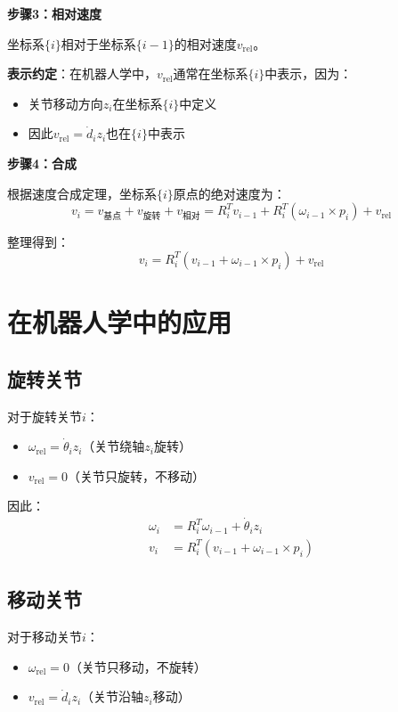 \documentclass[12pt,a4paper]{article}
\begin{document}
\textbf{步骤3：相对速度}

坐标系$\{i\}$相对于坐标系$\{i-1\}$的相对速度$v_{\text{rel}}$。

\textbf{表示约定}：在机器人学中，$v_{\text{rel}}$通常在坐标系$\{i\}$中表示，因为：
\begin{itemize}
\item 关节移动方向$z_i$在坐标系$\{i\}$中定义
\item 因此$v_{\text{rel}} = \dot{d}_i z_i$也在$\{i\}$中表示
\end{itemize}

\textbf{步骤4：合成}

根据速度合成定理，坐标系$\{i\}$原点的绝对速度为：
\begin{equation}
v_i = v_{\text{基点}} + v_{\text{旋转}} + v_{\text{相对}} = R_i^T v_{i-1} + R_i^T (\omega_{i-1} \times p_i) + v_{\text{rel}}
\end{equation}

整理得到：
\begin{equation}
v_i = R_i^T (v_{i-1} + \omega_{i-1} \times p_i) + v_{\text{rel}} \tag{4}
\end{equation}

\section{在机器人学中的应用}

\subsection{旋转关节}

对于旋转关节$i$：
\begin{itemize}
\item $\omega_{\text{rel}} = \dot{\theta}_i z_i$（关节绕轴$z_i$旋转）
\item $v_{\text{rel}} = 0$（关节只旋转，不移动）
\end{itemize}

因此：
\begin{align}
\omega_i &= R_i^T \omega_{i-1} + \dot{\theta}_i z_i \\
v_i &= R_i^T (v_{i-1} + \omega_{i-1} \times p_i)
\end{align}

\subsection{移动关节}

对于移动关节$i$：
\begin{itemize}
\item $\omega_{\text{rel}} = 0$（关节只移动，不旋转）
\item $v_{\text{rel}} = \dot{d}_i z_i$（关节沿轴$z_i$移动）
\end{itemize}
\end{document}
